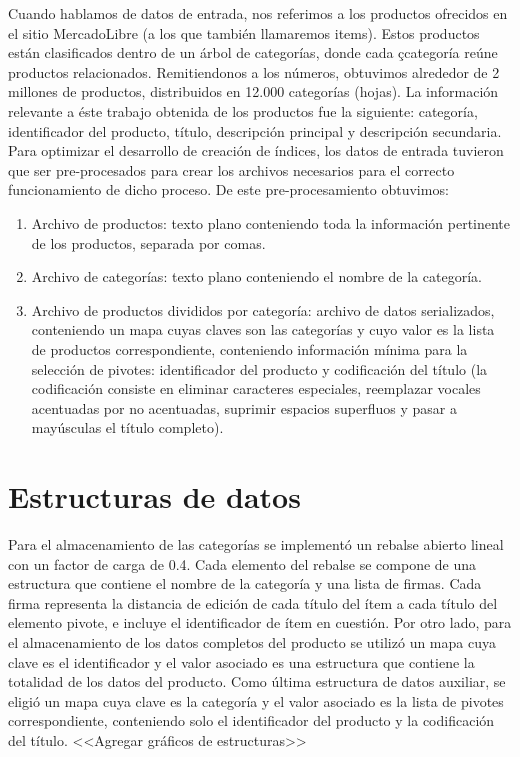 Cuando hablamos de datos de entrada, nos referimos a los productos ofrecidos en
 el sitio MercadoLibre (a los que tambi\'en llamaremos items). Estos productos 
 est\'an clasificados dentro de un \'arbol de categor\'ias, donde cada 
 çcategor\'ia re\'une productos relacionados. Remitiendonos a los n\'umeros, 
 obtuvimos alrededor de 2 millones de productos, distribuidos en 12.000 
 categor\'ias (hojas).
La informaci\'on relevante a \'este trabajo obtenida de los productos fue la 
siguiente: categor\'ia, identificador del producto, t\'itulo, descripci\'on 
principal y descripci\'on secundaria.
Para optimizar el desarrollo de creaci\'on de \'indices, los datos de entrada 
tuvieron que ser pre-procesados para crear los archivos necesarios para el 
correcto funcionamiento de dicho proceso. De este pre-procesamiento obtuvimos:
\begin{enumerate}[(1)]
\item  Archivo de productos: texto plano conteniendo toda la informaci\'on 
pertinente de los productos, separada por comas.
\item  Archivo de categor\'ias: texto plano conteniendo el nombre de la 
categor\'ia.
\item  Archivo de productos divididos por categor\'ia: archivo de datos 
serializados, conteniendo un mapa cuyas claves son las categor\'ias y cuyo 
valor es la lista de productos correspondiente, conteniendo informaci\'on 
m\'inima para la selecci\'on de pivotes: identificador del producto y 
codificaci\'on del t\'itulo (la codificaci\'on consiste en eliminar caracteres 
especiales, reemplazar vocales acentuadas por no acentuadas, suprimir espacios 
superfluos y pasar a may\'usculas el t\'itulo completo).
\end{enumerate}

\section{Estructuras de datos}
Para el almacenamiento de las categor\'ias se implement\'o un rebalse abierto 
lineal con un factor de carga de 0.4.
Cada elemento del rebalse se compone de una estructura que contiene el nombre 
de la categor\'ia y una lista de firmas. Cada firma representa la distancia de 
edici\'on de cada t\'itulo del \'item a cada t\'itulo del elemento pivote, e 
incluye el identificador de \'item en cuesti\'on.
Por otro lado, para el almacenamiento de los datos completos del producto se 
utiliz\'o un mapa cuya clave es el identificador y el valor asociado es una 
estructura que contiene la totalidad de los datos del producto.
Como \'ultima estructura de datos auxiliar, se eligi\'o un mapa cuya clave es 
la categor\'ia y el valor asociado es la lista de pivotes correspondiente, 
conteniendo solo el identificador del producto y la codificaci\'on del t\'itulo.
<<Agregar gr\'aficos de estructuras>>

